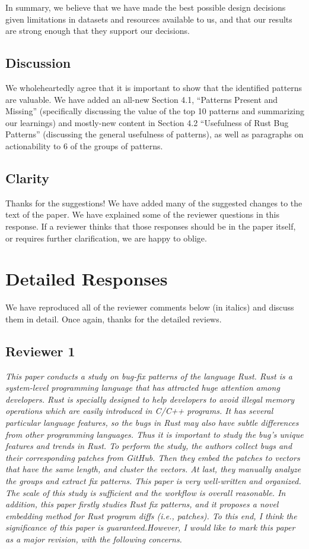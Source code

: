 \documentclass{article}
\begin{document}
In summary, we believe that we have made the best possible design decisions given limitations in datasets and resources available to us, and that our results are strong enough that they support our decisions.

\subsection{Discussion}

We wholeheartedly agree that it is important to show that the identified patterns are valuable. We have added an all-new Section 4.1, “Patterns Present and Missing” (specifically discussing the value of the top 10 patterns and summarizing our learnings) and mostly-new content in Section 4.2 “Usefulness of Rust Bug Patterns” (discussing the general usefulness of patterns), as well as paragraphs on actionability to 6 of the groups of patterns. 

\subsection{Clarity}

Thanks for the suggestions! We have added many of the suggested changes to the text of the paper. We have explained some of the reviewer questions in this response. If a reviewer thinks that those responses should be in the paper itself, or requires further clarification, we are happy to oblige.

\section{Detailed Responses}
\label{sec:detailed}
We have reproduced all of the reviewer comments below (in italics) and discuss them in detail. Once again, thanks for the detailed reviews.

\subsection{Reviewer 1}

\textit{This paper conducts a study on bug-fix patterns of the language Rust. Rust is a system-level programming language that has attracted huge attention among developers. Rust is specially designed to help developers to avoid illegal memory operations which are easily introduced in C/C++ programs. It has several particular language features, so the bugs in Rust may also have subtle differences from other programming languages. Thus it is important to study the bug's unique features and trends in Rust.
To perform the study, the authors collect bugs and their corresponding patches from GitHub. Then they embed the patches to vectors that have the same length, and cluster the vectors. At last, they manually analyze the groups and extract fix patterns.
This paper is very well-written and organized. The scale of this study is sufficient and the workflow is overall reasonable. In addition, this paper firstly studies Rust fix patterns, and it proposes a novel embedding method for Rust program diffs (i.e., patches). To this end, I think the significance of this paper is guaranteed.However, I would like to mark this paper as a major revision, with the following concerns.}
\end{document}
